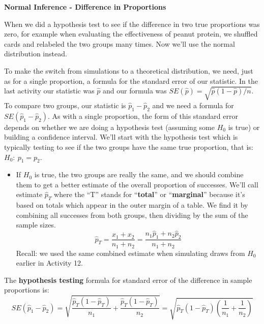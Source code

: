 \def\theTopic{Difference in Proportions - Z }
\def\dayNum{23 }


\begin{center}
{\bf {\large \textbf{Normal Inference - Difference in Proportions}}}
\end{center}


When we did a hypothesis test to see if the difference in  two true
proportions was zero,  for example when evaluating the effectiveness
of peanut protein, we shuffled cards and relabeled the two groups many
times. Now we'll use the normal distribution instead.  
  

 To make the switch from simulations to a theoretical distribution,
 we need, just as for a single proportion, a formula for the standard
 error of our statistic.  In the last activity our statistic was
 $\widehat{p}$ and our formula was $SE(\widehat{p}) =
 \sqrt{\widehat{p}(1-\widehat{p})/n}$.  To compare two groups, our 
statistic is $\widehat{p}_1 - \widehat{p}_2$ and we need a formula for
$SE(\widehat{p}_1 - \widehat{p}_2)$. As with a single proportion, the
form of this standard error depends on whether we are doing a
hypothesis test (assuming some $H_0$ is true) or building a confidence
interval.  We'll start with the hypothesis test which is typically
testing to see if the two groups have the same true proportion, that
is:  $H_0:\ p_1 = p_2$.
 \begin{itemize}
 \item If $H_0$ is true, the two groups are really the same, and we
   should combine them to get a better estimate of the overall
   proportion of successes. We'll call estimate $\widehat{p}_T$ where
   the ``T'' stands for ``{\bf total}'' or ``{\bf marginal}'' because it's
   based on totals which appear in the outer margin of a table.  We
   find it by combining all successes from both 
   groups, then dividing by the sum of the sample sizes. 
  $$\widehat{p}_T = \frac{x_1 + x_2}{n_1+n_2} = \frac{n_1\widehat{p}_1
    + n_2\widehat{p}_2}{n_1 + n_2}$$ 
  Recall:  we used the same combined estimate when simulating draws
  from $H_0$ earlier in Activity 12.
 \end{itemize}

 The {\bf hypothesis testing} formula for standard error of the
 difference in sample proportions is: 
 $$SE(\widehat{p}_1 - \widehat{p}_2) =
 \sqrt{\frac{\widehat{p}_T(1-\widehat{p}_T)}{n_1} +
   \frac{\widehat{p}_T(1-\widehat{p}_T)}{n_2}} =
  \sqrt{\widehat{p}_T(1-\widehat{p}_T)\left(\frac{1}{n_1} +
   \frac{1}{n_2}\right)}$$


